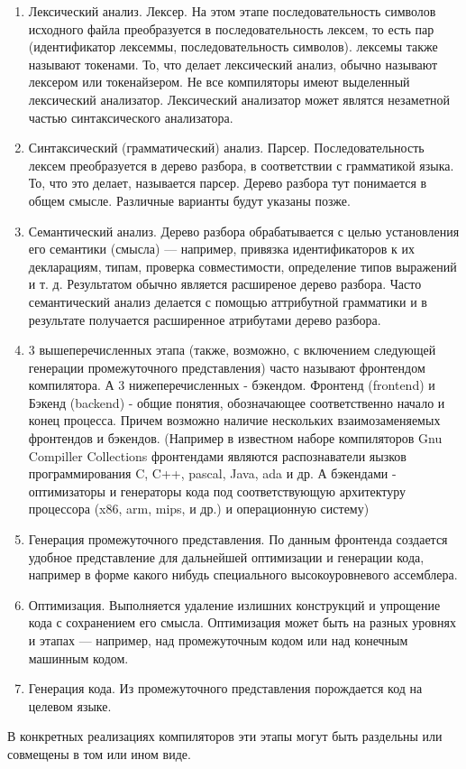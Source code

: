 \documentclass[a4paper,12pt]{article}
\begin{document}
\begin{enumerate}
  \item Лексический анализ. Лексер. На этом этапе последовательность символов
  исходного файла преобразуется в последовательность лексем, то есть пар (идентификатор
  лексеммы, последовательность символов). лексемы также называют токенами. То,
  что делает лексический анализ, обычно называют лексером или токенайзером.
  Не все компиляторы имеют выделенный лексический анализатор. Лексический
  анализатор может являтся незаметной частью синтаксического анализатора.
  \item Синтаксический (грамматический) анализ. Парсер. Последовательность
  лексем преобразуется в дерево разбора, в соответствии с грамматикой языка. То,
  что это делает, называется парсер. Дерево разбора тут понимается в общем
  смысле. Различные варианты будут указаны позже.
  \item Семантический анализ. Дерево разбора обрабатывается с целью
  установления его семантики (смысла) — например, привязка идентификаторов к их
  декларациям, типам, проверка совместимости, определение типов выражений и т.
  д. Результатом обычно является расширеное дерево разбора. Часто семантический
  анализ делается с помощью аттрибутной грамматики и в результате получается
  расширенное атрибутами дерево разбора.
  \item 3 вышеперечисленных этапа (также, возможно, с включением следующей
  генерации промежуточного представления) часто называют фронтендом
  компилятора. А 3 нижеперечисленных - бэкендом. Фронтенд (frontend) и Бэкенд
  (backend) - общие понятия, обозначающее соответственно начало и конец
  процесса. Причем возможно наличие нескольких взаимозаменяемых фронтендов и
  бэкендов. (Например в известном наборе компиляторов Gnu Compiller Collections
  фронтендами являются распознаватели яызков программирования C, C++, pascal,
  Java, ada и др. А бэкендами - оптимизаторы и генераторы кода под
  соответствующую архитектуру процессора (x86, arm, mips, и др.) и
  операционную систему)
  \item Генерация промежуточного представления. По данным фронтенда создается
  удобное представление для дальнейшей оптимизации и генерации кода, например в
  форме какого нибудь специального высокоуровневого ассемблера.
  \item Оптимизация. Выполняется удаление излишних конструкций и упрощение кода
  с сохранением его смысла. Оптимизация может быть на разных уровнях и этапах —
  например, над промежуточным кодом или над конечным машинным кодом.
  \item Генерация кода. Из промежуточного представления порождается код на
  целевом языке.
\end{enumerate}
В конкретных реализациях компиляторов эти этапы могут быть раздельны или
совмещены в том или ином виде. 
\end{document}

